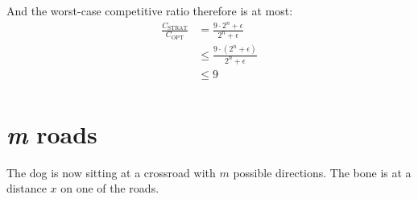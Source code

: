 And the worst-case competitive ratio therefore is at most:
\[
\begin{array}{ll}
  \frac{C_\text{STRAT}}{C_\text{OPT}}
    & = \frac{9 \cdot 2^n + \epsilon}{2^n + \epsilon}\\
    & \leq \frac{9 \cdot (2^n + \epsilon)}{2^n + \epsilon}\\
    & \leq 9\\
\end{array}
\]


\section{\textit{m} roads}

The dog is now sitting at a crossroad with $m$ possible directions. The bone is at a distance $x$ on one of the roads.
